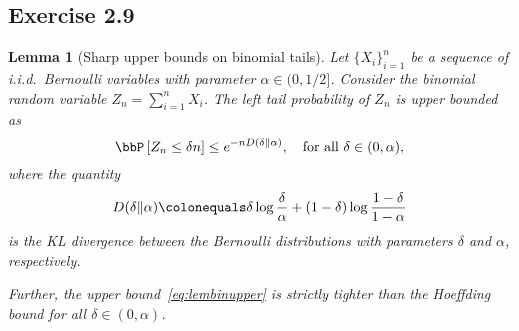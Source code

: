 \documentclass[11pt]{article}
\newcommand{\of}[1]{\left(#1\right)}
\newcommand{\off}[1]{\left[#1\right]}
\theoremstyle{plain}
\newtheorem{lem}{Lemma}
\theoremstyle{definition}
\begin{document}
\subsection{Exercise 2.9}\label{exe:29}
\begin{lem}[Sharp upper bounds on binomial tails]\label{lem:sharpbin}
	Let $\{X_i\}_{i=1}^n$ be a sequence of i.i.d.\ Bernoulli variables with parameter $\alpha \in (0,1/2]$. Consider the binomial random variable $Z_n = \sum_{i=1}^n X_i$. The left tail probability of $Z_n$ is upper bounded as
	\begin{equation}\label{eq:lembinupper}
		\bbP\off{Z_n \leq \delta n} \leq e^{-n D\of{\delta \Vert \alpha}}, \quad \text{for all }\delta \in (0,\alpha),
	\end{equation}
	where the quantity 
	\begin{equation}\label{eq:kldiv}
		D(\delta \Vert \alpha) \colonequals \delta \log \frac{\delta}{\alpha} + (1-\delta) \log \frac{1-\delta}{1-\alpha}
	\end{equation}
	is the KL divergence between the Bernoulli distributions with parameters $\delta$ and $\alpha$, respectively.
	
	Further, the upper bound~\eqref{eq:lembinupper} is strictly tighter than the Hoeffding bound for all $\delta \in (0,\alpha)$.
\end{lem}
\end{document}
